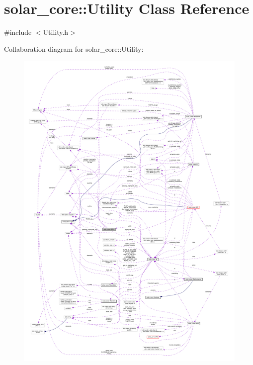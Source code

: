 \hypertarget{classsolar__core_1_1_utility}{}\section{solar\+\_\+core\+:\+:Utility Class Reference}
\label{classsolar__core_1_1_utility}


{\ttfamily \#include $<$Utility.\+h$>$}



Collaboration diagram for solar\+\_\+core\+:\+:Utility\+:
\nopagebreak
\begin{figure}[H]
\begin{center}
\leavevmode
\includegraphics[width=350pt]{classsolar__core_1_1_utility__coll__graph}
\end{center}
\end{figure}
